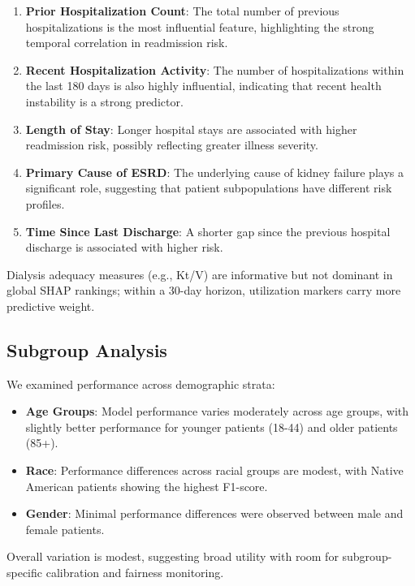 \documentclass[conference]{IEEEtran}
\begin{document}
\begin{enumerate}
    \item \textbf{Prior Hospitalization Count}: The total number of previous hospitalizations is the most influential feature, highlighting the strong temporal correlation in readmission risk.
    \item \textbf{Recent Hospitalization Activity}: The number of hospitalizations within the last 180 days is also highly influential, indicating that recent health instability is a strong predictor.
    \item \textbf{Length of Stay}: Longer hospital stays are associated with higher readmission risk, possibly reflecting greater illness severity.
    \item \textbf{Primary Cause of ESRD}: The underlying cause of kidney failure plays a significant role, suggesting that patient subpopulations have different risk profiles.
    \item \textbf{Time Since Last Discharge}: A shorter gap since the previous hospital discharge is associated with higher risk.
\end{enumerate}

Dialysis adequacy measures (e.g., Kt/V) are informative but not dominant in global SHAP rankings; within a 30-day horizon, utilization markers carry more predictive weight.

\subsection{Subgroup Analysis}
We examined performance across demographic strata:

\begin{itemize}
    \item \textbf{Age Groups}: Model performance varies moderately across age groups, with slightly better performance for younger patients (18-44) and older patients (85+).
    \item \textbf{Race}: Performance differences across racial groups are modest, with Native American patients showing the highest F1-score.
    \item \textbf{Gender}: Minimal performance differences were observed between male and female patients.
\end{itemize}

Overall variation is modest, suggesting broad utility with room for subgroup-specific calibration and fairness monitoring.
\end{document}

